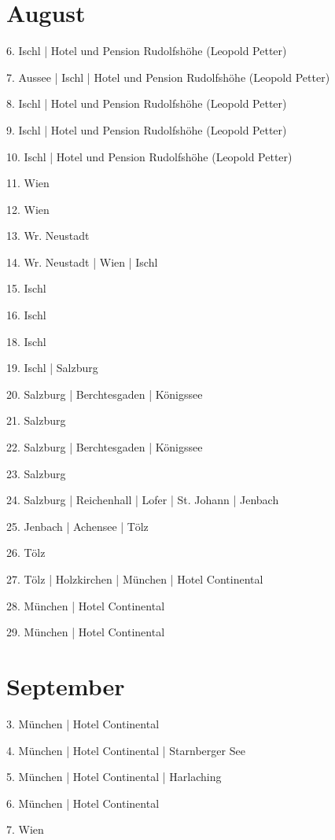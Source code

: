\documentclass[twoside=false,titlepage=false,open=any, parskip=never, fontsize=10pt, headings=small, chapterprefix=false, appendixprefix=false, DIV=15]{scrbook}
\begin{document}
\begin{multicols}{3}
            \section*{August}
            6. Ischl | Hotel und Pension Rudolfshöhe (Leopold Petter)\par
            7. Aussee | Ischl | Hotel und Pension Rudolfshöhe (Leopold Petter)\par
            8. Ischl | Hotel und Pension Rudolfshöhe (Leopold Petter)\par
            9. Ischl | Hotel und Pension Rudolfshöhe (Leopold Petter)\par
            10. Ischl | Hotel und Pension Rudolfshöhe (Leopold Petter)\par
            11. Wien\par
            12. Wien\par
            13. Wr. Neustadt\par
            14. Wr. Neustadt | Wien | Ischl\par
            15. Ischl\par
            16. Ischl\par
            18. Ischl\par
            19. Ischl | Salzburg\par
            20. Salzburg | Berchtesgaden | Königssee\par
            21. Salzburg\par
            22. Salzburg | Berchtesgaden | Königssee\par
            23. Salzburg\par
            24. Salzburg | Reichenhall | Lofer | St. Johann | Jenbach\par
            25. Jenbach | Achensee | Tölz\par
            26. Tölz\par
            27. Tölz | Holzkirchen | München | Hotel Continental\par
            28. München | Hotel Continental\par
            29. München | Hotel Continental\par
            \section*{September}
            3. München | Hotel Continental\par
            4. München | Hotel Continental | Starnberger See\par
            5. München | Hotel Continental | Harlaching\par
            6. München | Hotel Continental\par
            7. Wien\par

\end{multicols}
\end{document}
